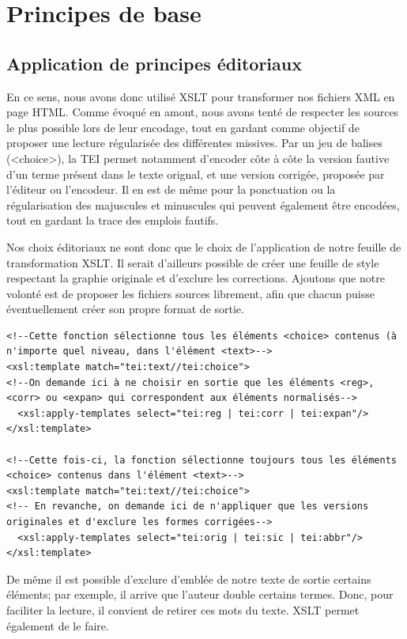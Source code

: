 \documentclass[12pt,a4paper]{book} %
\begin{document}
\section{Principes de base}
\subsection{Application de principes éditoriaux}

En ce sens, nous avons donc utilisé XSLT pour transformer nos fichiers XML en page HTML. Comme  évoqué en amont, nous avons tenté de respecter les sources le plus possible lors de leur encodage, tout en gardant comme objectif de proposer une lecture régularisée des différentes missives. Par un jeu de balises (<choice>), la TEI permet notamment d'encoder côte à côte la version fautive d'un terme présent dans le texte orignal, et une version corrigée, proposée par l'éditeur ou l'encodeur. Il en est de même pour la ponctuation ou la régularisation des majuscules et minuscules qui peuvent également être encodées, tout en gardant la trace des emplois fautifs.

Nos choix éditoriaux ne sont donc que le choix de l'application de notre feuille de transformation XSLT. Il serait d'ailleurs possible de créer une feuille de style respectant la graphie originale et d'exclure les corrections. Ajoutons que notre volonté est de proposer les fichiers sources librement, afin que chacun puisse éventuellement créer son propre format de sortie.
\bigskip

\begin{lstlisting}
<!--Cette fonction sélectionne tous les éléments <choice> contenus (à n'importe quel niveau, dans l'élément <text>-->
<xsl:template match="tei:text//tei:choice">
<!--On demande ici à ne choisir en sortie que les éléments <reg>, <corr> ou <expan> qui correspondent aux éléments normalisés-->
  <xsl:apply-templates select="tei:reg | tei:corr | tei:expan"/>
</xsl:template>

<!--Cette fois-ci, la fonction sélectionne toujours tous les éléments <choice> contenus dans l'élément <text>-->
<xsl:template match="tei:text//tei:choice">
<!-- En revanche, on demande ici de n'appliquer que les versions originales et d'exclure les formes corrigées-->
  <xsl:apply-templates select="tei:orig | tei:sic | tei:abbr"/>
</xsl:template>
\end{lstlisting}
\bigskip

De même il est possible d'exclure d'emblée de notre texte de sortie certains éléments; par exemple, il arrive que l'auteur double certains termes. Donc, pour faciliter la lecture, il convient de retirer ces mots du texte. XSLT permet également de le faire.
\bigskip
\end{document}
